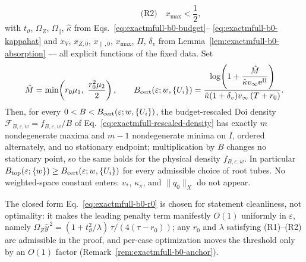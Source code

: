 \begin{proposition}
\begin{equation}
 \qquad\qquad
 \text{(R2)}\quad x_{\max}<\frac12,
 \label{eq:exactmfull-b0-radius}
\end{equation}
with \(t_\vartheta\), \(\Omega_Z\), \(\Omega_\parallel\), \(\hat\kappa\)
from Eqs.~\eqref{eq:exactmfull-b0-budget}--%
\eqref{eq:exactmfull-b0-kappahat} and \(x_V\), \(x_{Z,0}\),
\(x_{\parallel,0}\), \(x_{\max}\), \(\Pi\), \(\delta_v\) from
Lemma~\ref{lem:exactmfull-b0-absorption} --- all explicit functions of the
fixed data.  Set
\begin{equation}
 \hat M=\min\!\left(r_0\mu_1,\ \frac{r_0^2\mu_2}{2}\right),
 \qquad
 B_{\rm cert}(\varepsilon;w,\{U_i\})
 =\frac{\log\!\left(1+\dfrac{\hat M}{\hat\kappa v_\infty\e^{\Pi}}\right)}
 {\hat\kappa(1+\delta_v)v_\infty\,(T+r_0)}.
 \label{eq:exactmfull-b0-threshold}
\end{equation}
Then, for every
\(0<B<B_{\rm cert}(\varepsilon;w,\{U_i\})\), the budget-rescaled
Doi density \(\mathcal F_{B,\varepsilon,w}=f_{B,\varepsilon,w}/B\) of
Eq.~\eqref{eq:exactmfull-rescaled-density} has exactly \(m\) nondegenerate
maxima and \(m-1\) nondegenerate minima on \(I\), ordered alternately, and
no stationary endpoint; multiplication by \(B\) changes no stationary
point, so the same holds for the physical density
\(f_{B,\varepsilon,w}\).  In particular
\(B_{\rm top}(\varepsilon;\{w\})
\ge B_{\rm cert}(\varepsilon;w,\{U_i\})\) for every admissible choice of
root tubes.  No weighted-space constant enters: \(v_*\),
\(\kappa_\pi\), and \(\|q_0\|_X\) do not appear.
\end{proposition}

The closed form Eq.~\eqref{eq:exactmfull-b0-r0} is chosen for statement
cleanliness, not optimality: it makes the leading penalty term manifestly
\(O(1)\) uniformly in \(\varepsilon\), namely
\(\Omega_Z\hat y^{\,2}=(1+t_\vartheta^2/\lambda)\,\tau/(4(\tau-r_0))\); any
\(r_0\) and \(\lambda\) satisfying (R1)--(R2) are admissible in the proof,
and per-case optimization moves the threshold only by an \(O(1)\) factor
(Remark~\ref{rem:exactmfull-b0-anchor}).


